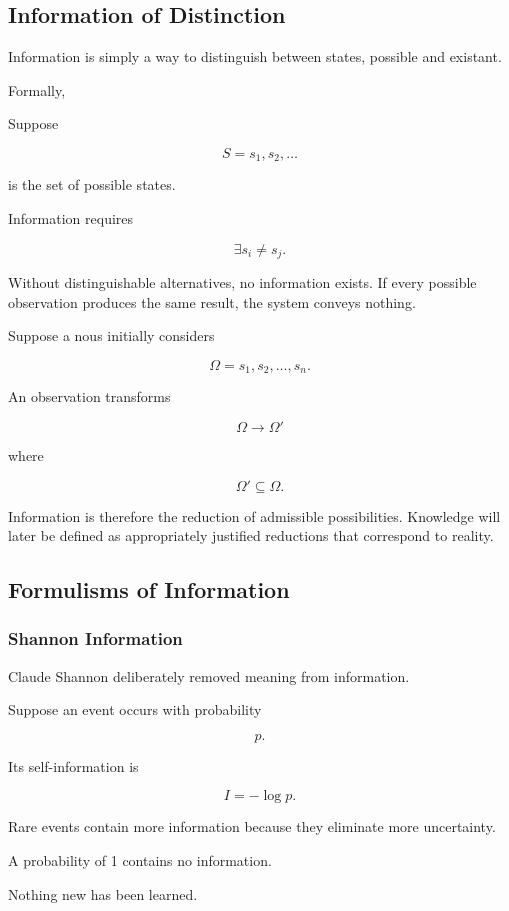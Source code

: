 \subsection{Information of Distinction}

Information is simply a way to distinguish between states, possible and existant.

Formally,

Suppose

\[
S={s_1,s_2,\ldots}
\]

is the set of possible states.

Information requires

\[
\exists s_i\neq s_j.
\]

Without distinguishable alternatives, no information exists. If every possible observation produces the same result, the system conveys nothing.

Suppose a nous initially considers

\[
\Omega={s_1,s_2,\ldots,s_n}.
\]

An observation transforms

\[
\Omega
\longrightarrow
\Omega'
\]

where

\[
\Omega'\subseteq\Omega.
\]

Information is therefore the reduction of admissible possibilities. Knowledge will later be defined as appropriately justified reductions that correspond to reality.

\subsection{Formulisms of Information}

\subsubsection{Shannon Information}
Claude Shannon deliberately removed meaning from information.

Suppose an event occurs with probability

\[
p.
\]

Its self-information is

\[
I=-\log p.
\]

Rare events contain more information because they eliminate more uncertainty.

A probability of 1 contains no information.

Nothing new has been learned.

